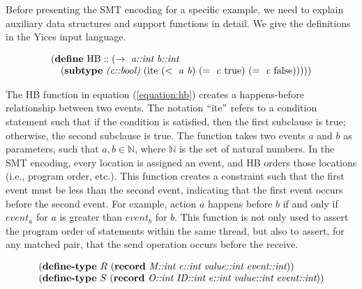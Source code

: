 Before presenting the SMT encoding for a specific example, we need to explain auxiliary data structures and support functions in detail. We give the definitions in the Yices \cite{dutertre:CAV06} input language.

\begin{equation}
\begin{array}{l}
(\textbf{define}\ \mathrm{HB}::(\rightarrow\ \emph{a::int}\ \emph{b::int}\\
\ \ \ (\textbf{subtype}\ \emph{(c::bool)}\ (\mathrm{ite}\ (<\ \mathit{a}\ \mathit{b})\ (=\ \mathit{c}\ \mathrm{true})\ (=\ \mathit{c}\ \mathrm{false})))))
\end{array}
\label{equation:hb}
\end{equation}


The HB function in equation (\ref{equation:hb}) creates a happens-before relationship between two events. The notation $``\mathrm{ite}"$ refers to a condition statement such that if the condition is satisfied, then the first subclause is true; otherwise, the second subclause is true. The function takes two events $a$ and $b$ as parameters, such that $a,b \in \mathbb{N}$, where $\mathbb{N}$ is the set of natural numbers. In the SMT encoding, every location is assigned an event, and HB orders those locations (i.e., program order, etc.). This function creates a constraint such that the first event must be less than the second event, indicating that the first event occurs before the second event. For example, action $a$ happens before $b$ if and only if $\mathit{event}_a$ for $a$ is greater than $\mathit{event}_b$ for $b$. This function is not only used to assert the program order of statements within the same thread, but also to assert, for any matched pair, that the send operation
occurs before the receive.

\begin{equation}
\begin{array}{l}
(\textbf{define-type}\ R\ (\textbf{record}\ \emph{M::int}\ \emph{e::int}\ \emph{value::int}\ \emph{event::int})) \\
(\textbf{define-type}\ S\ (\textbf{record}\ \emph{O::int}\ \emph{ID::int}\ \emph{e::int}\ \emph{value::int}\ \emph{event::int}))
\end{array}
\label{equation:record}
\end{equation}

